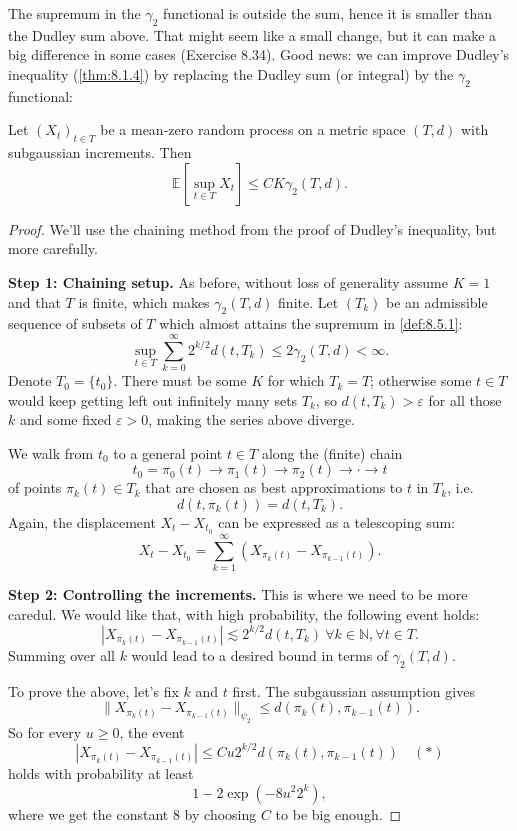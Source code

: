 The supremum in the $\gamma_2$ functional is outside the sum, hence it is smaller than the Dudley sum above. 
That might seem like a small change, but it can make a big difference in some cases (Exercise 8.34). Good news: 
we can improve Dudley's inequality (\cref{thm:8.1.4}) by replacing the Dudley sum (or integral) by the 
$\gamma_2$ functional:

\begin{theorem}
\label{thm:8.5.2}
Let $(X_t)_{t \in T}$ be a mean-zero random process on a metric space $(T, d)$ with subgaussian increments. Then 
\[ \mathbb{E}\left[ \sup_{t \in T}X_t \right] \leq CK \gamma_2(T, d). \]
\end{theorem}

\begin{proof}
We'll use the chaining method from the proof of Dudley's inequality, but more carefully.

\textbf{Step 1: Chaining setup.} As before, without loss of generality assume $K = 1$ and that $T$ is finite, 
which makes $\gamma_2(T, d)$ finite. Let $(T_k)$ be an admissible sequence of subsets of $T$ which almost 
attains the supremum in \cref{def:8.5.1}:
\[ \sup_{t \in T}\sum_{k = 0}^{\infty}2^{k/2}d(t, T_k) \leq 2 \gamma_2(T, d) < \infty. \]
Denote $T_0 = \{ t_0 \}$. There must be some $K$ for which $T_k = T$; otherwise some $t \in T$ would keep 
getting left out infinitely many sets $T_k$, so $d(t, T_k) > \varepsilon$ for all those $k$ and some fixed 
$\varepsilon > 0$, making the series above diverge.

We walk from $t_0$ to a general point $t \in T$ along the (finite) chain 
\[ t_0 = \pi_0(t) \to \pi_1(t) \to \pi_2(t) \to \cdot \to t \]
of points $\pi_k(t) \in T_k$ that are chosen as best approximations to $t$ in $T_k$, i.e.
\[ d(t, \pi_k(t)) = d(t, T_k). \]
Again, the displacement $X_t - X_{t_0}$ can be expressed as a telescoping sum:
\[ X_t - X_{t_0} = \sum_{k = 1}^{\infty}(X_{\pi_k(t)} - X_{\pi_{k - 1}(t)}). \]

\textbf{Step 2: Controlling the increments.} This is where we need to be more caredul. We would like that, with 
high probability, the following event holds:
\[ |X_{\pi_k(t)} - X_{\pi_{k - 1}(t)}| \lesssim 2^{k/2}d(t, T_k) \ \forall k \in \mathbb{N}, \forall t \in T. \]
Summing over all $k$ would lead to a desired bound in terms of $\gamma_2(T, d)$.

To prove the above, let's fix $k$ and $t$ first. The subgaussian assumption gives 
\[ \lVert X_{\pi_k(t)} - X_{\pi_{k - 1}(t)} \rVert_{\psi_2} \leq d(\pi_k(t), \pi_{k - 1}(t)). \]
So for every $u \geq 0$, the event 
\[ |X_{\pi_k(t)} - X_{\pi_{k - 1}(t)}| \leq Cu 2^{k/2} d(\pi_k(t), \pi_{k - 1}(t)) \quad (*) \]
holds with probability at least 
\[ 1 - 2 \exp{(-8u^2 2^k)}, \]
where we get the constant 8 by choosing $C$ to be big enough.


\end{proof}

